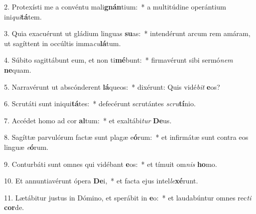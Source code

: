 2. Protexísti me a convéntu mali\textbf{gnán}tium:~*  a multitúdine operántium ini\textit{qui}\textbf{tá}tem.\

3. Quia exacuérunt ut gládium linguas \textbf{su}as:~*  intendérunt arcum rem amáram, ut sagíttent in occúltis imma\textit{cu}\textbf{lá}tum.\

4. Súbito sagittábunt eum, et non ti\textbf{mé}bunt:~*  firmavérunt sibi sermó\textit{nem} \textbf{ne}quam.\

5. Narravérunt ut abscónderent \textbf{lá}queos:~*  dixérunt: Quis vidé\textit{bit} \textbf{e}os?\

6. Scrutáti sunt iniqui\textbf{tá}tes:~*  defecérunt scrutántes \textit{scru}\textbf{tí}nio.\

7. Accédet homo ad cor \textbf{al}tum:~*  et exaltábi\textit{tur} \textbf{De}us.\

8. Sagíttæ parvulórum factæ sunt plagæ e\textbf{ó}rum:~*  et infirmátæ sunt contra eos linguæ \textit{e}\textbf{ó}rum.\

9. Conturbáti sunt omnes qui vidébant \textbf{e}os:~*  et tímuit om\textit{nis} \textbf{ho}mo.\

10. Et annuntiavérunt ópera \textbf{De}i,~*  et facta ejus intel\textit{le}\textbf{xé}runt.\

11. Lætábitur justus in Dómino, et sperábit in \textbf{e}o:~*  et laudabúntur omnes rec\textit{ti} \textbf{cor}de.\

